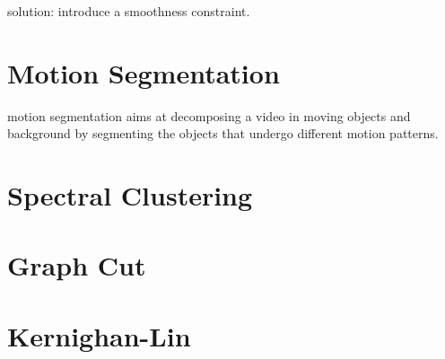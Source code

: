 solution: introduce a smoothness constraint.


\section{Motion Segmentation}
motion segmentation aims at decomposing a video in moving objects and background by segmenting the objects that undergo different motion patterns.
\section{Spectral Clustering}
\section{Graph Cut}
\section{Kernighan-Lin}

